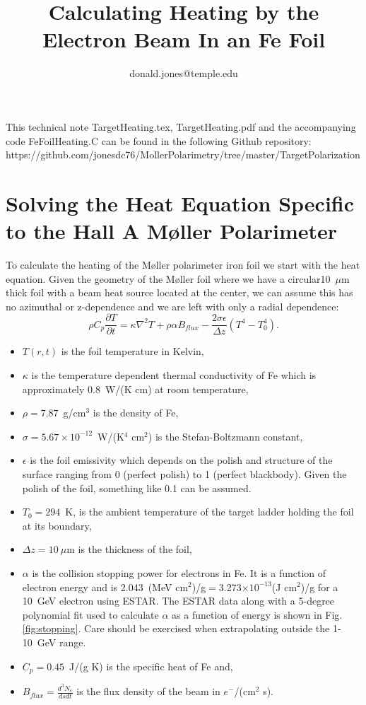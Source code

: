 \documentclass[12pt]{article}
\title{\color{BlueViolet}\bfseries\Huge Calculating Heating by the Electron Beam In an Fe Foil}
\author{\color{BurntOrange}donald.jones@temple.edu}
\date{}
\begin{document}
\maketitle
This technical note TargetHeating.tex, TargetHeating.pdf and the accompanying code FeFoilHeating.C can be found in the following Github repository: \\https://github.com/jonesdc76/MollerPolarimetry/tree/master/TargetPolarization
\section{Solving the Heat Equation Specific to the Hall A M\o ller Polarimeter}
To calculate the heating of the M\o ller polarimeter iron foil we start with the heat equation. Given the geometry of the M\o ller foil where we have a circular10~$\mu$m thick foil with a beam heat source located at the center, we can assume this has no azimuthal or z-dependence and we are left with only a radial dependence:
\begin{equation}
\label{eq:heat_T_r_t}
\rho C_p\frac{\partial T}{\partial t}=\kappa\nabla^2T+\rho\alpha B_{flux}-\frac{2\sigma\epsilon}{\Delta z}\left(T^4-T_0^4\right).
\end{equation}
\begin{itemize}
\item{$T(r, t)$ is the foil temperature in Kelvin,}
\item{$\kappa$ is the temperature dependent thermal conductivity of Fe which is approximately 0.8~W/(K cm) at room temperature,}
\item{$\rho =7.87$~g/cm$^3$ is the density of Fe,}
\item{$\sigma =5.67\times 10^{-12}$~W/(K$^4$ cm$^2$) is the Stefan-Boltzmann constant,}
\item{$\epsilon$ is the foil emissivity which depends on the polish and structure of the surface ranging from 0 (perfect polish) to 1 (perfect blackbody). Given the polish of the foil, something like 0.1 can be assumed.}
\item{$T_0=294$~K, is the ambient temperature of the target ladder holding the foil at its boundary,}
\item{$\Delta z=10~\mu$m is the thickness of the foil,}
\item{$\alpha$ is the collision stopping power for electrons in Fe. It is a function of electron energy and is 2.043~(MeV cm$^2$)/g$=$3.273$\times 10^{-13}$(J cm$^2$)/g for a 10~GeV electron using ESTAR. The ESTAR data along with a 5-degree polynomial fit used to calculate $\alpha$ as a function of energy is shown in Fig. \ref{fig:stopping}. Care should be exercised when extrapolating outside the 1-10~GeV range.}
\item{$C_p=0.45$~J/(g K) is the specific heat of Fe and,} 
\item{$B_{flux}=\frac{d^3N_e}{ds dt} $ is the flux density of the beam in $e^-$/(cm$^2$ s).}
\end{itemize}
\end{document}
